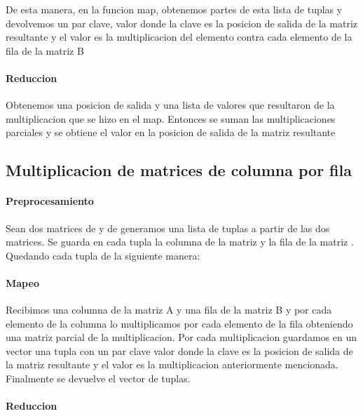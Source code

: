         De esta manera, en la funcion map, obtenemos partes de esta lista de
        tuplas y devolvemos un par clave, valor donde la clave es la posicion
        de salida de la matriz resultante  y el valor es la
        multiplicacion del elemento  contra cada elemento de la
        fila  de la matriz B

    \paragraph{Reduccion}

        Obtenemos una posicion de salida y una lista de valores que resultaron
        de la multiplicacion que se hizo en el map. Entonces se suman las
        multiplicaciones parciales y se obtiene el valor en la posicion de salida
        de la matriz resultante

\subsection{Multiplicacion de matrices de columna por fila}

    \paragraph{Preprocesamiento}

        Sean dos matrices  de  y  de 
        generamos una lista de tuplas a partir de las dos matrices.
        Se guarda en cada tupla la columna  de la matriz  y
        la fila  de la matriz . Quedando cada tupla de la
        siguiente manera:\\

    \paragraph{Mapeo}
        Recibimos una columna de la matriz A y una fila de la matriz B y por cada
        elemento de la columna  lo multiplicamos por cada elemento
        de la fila  obteniendo una matriz parcial de la
        multiplicacion. Por cada multiplicacion guardamos en un vector una tupla
        con un par clave valor donde la clave es la posicion de salida de la matriz
        resultante y el valor es la multiplicacion anteriormente mencionada.
        Finalmente se devuelve el vector de tuplas.

    \paragraph{Reduccion}


